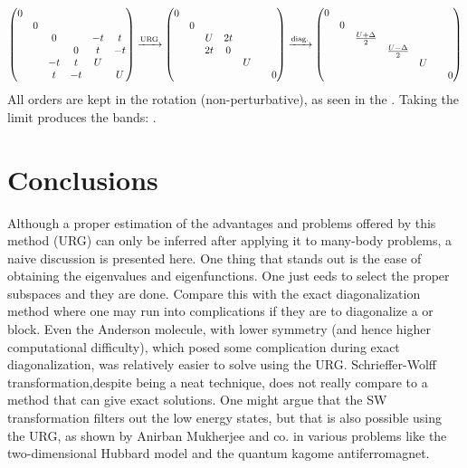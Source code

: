 \documentclass[12pt]{article}
\begin{document}
\begin{gather*}
\begin{pmatrix}
	0 &&&&&\\
	& 0&&&&\\
	&& 0 && -t & t \\
	&&& 0 & t & -t \\
	&& -t & t & U & \\
	&& t & -t && U \\
\end{pmatrix}
\xrightarrow{\text{URG}}
\begin{pmatrix}
	0 &&&&& \\
	& 0 &&&& \\
	&& U & 2t && \\
	&& 2t & 0 && \\
	&&&& U & \\
	&&&&& & 0 \\
\end{pmatrix}
\xrightarrow{\text{diag.}}
\begin{pmatrix}
	0 &&&&& \\
	& 0 &&&& \\
	&& \frac{U+\Delta}{2} &&& \\
	&&& \frac{U-\Delta}{2} && \\
	&&&& U & \\
	&&&&& & 0 \\
\end{pmatrix}
\end{gather*}
All orders are kept in the rotation (non-perturbative), as seen in the . Taking the limit  produces the bands: .

\newpage

\section*{Conclusions}
Although a proper estimation of the advantages and problems offered by this method (URG) can only be inferred after applying it to many-body problems, a naive discussion is presented here. One thing that stands out is the ease of obtaining the eigenvalues and eigenfunctions. One just eeds to select the proper subspaces and they are done. Compare this with the exact diagonalization method where one may run into complications if they are to diagonalize a  or  block. Even the Anderson molecule, with lower symmetry (and hence higher computational difficulty), which posed some complication during exact diagonalization, was relatively easier to solve using the URG. Schrieffer-Wolff transformation,despite being a neat technique, does not really compare to a method that can give exact solutions. One might argue that the SW transformation filters out the low energy states, but that is also possible using the URG, as shown by Anirban Mukherjee and co. in various problems like the two-dimensional Hubbard model and the quantum kagome antiferromagnet.
\end{document}
